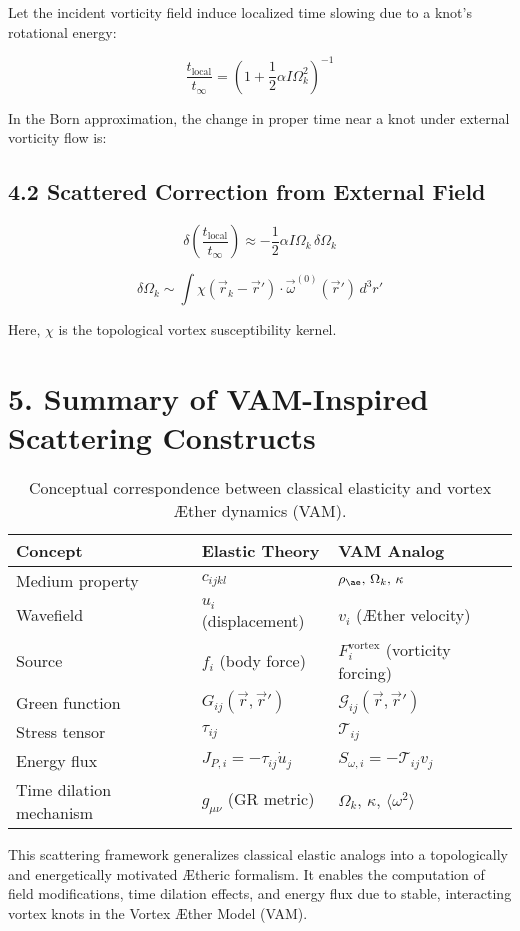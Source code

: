 Let the incident vorticity field induce localized time slowing due to a knot’s rotational energy:

\[
\frac{t_{\text{local}}}{t_{\infty}} = \left(1 + \frac{1}{2} \alpha I \Omega_k^2 \right)^{-1}
\]

In the Born approximation, the change in proper time near a knot under external vorticity flow is:

\subsection*{4.2 Scattered Correction from External Field}

\[
\delta \left( \frac{t_{\text{local}}}{t_{\infty}} \right) \approx - \frac{1}{2} \alpha I \Omega_k \, \delta \Omega_k
\]

\[
\delta \Omega_k \sim \int \chi(\vec{r}_k - \vec{r}') \cdot \vec{\omega}^{(0)}(\vec{r}') \, d^3r'
\]

Here, \(\chi\) is the topological vortex susceptibility kernel.



\section*{5. Summary of VAM-Inspired Scattering Constructs}


\begin{table}[h!]
    \centering
    \begin{tabular}{lll}
        \toprule
        \textbf{Concept} & \textbf{Elastic Theory} & \textbf{VAM Analog} \\
        \midrule
        Medium property & \( c_{ijkl} \) & \( \rho_{\ae},\, \Omega_k,\, \kappa \) \\
        Wavefield & \( u_i \) (displacement) & \( v_i \) (Æther velocity) \\
        Source & \( f_i \) (body force) & \( F_i^{\text{vortex}} \) (vorticity forcing) \\
        Green function & \( G_{ij}(\vec{r}, \vec{r}') \) & \( \mathcal{G}_{ij}(\vec{r}, \vec{r}') \) \\
        Stress tensor & \( \tau_{ij} \) & \( \mathcal{T}_{ij} \) \\
        Energy flux & \( J_{P,i} = -\tau_{ij} \dot{u}_j \) & \( S_{\omega,i} = -\mathcal{T}_{ij} v_j \) \\
        Time dilation mechanism & \( g_{\mu\nu} \) (GR metric) & \( \Omega_k,\, \kappa,\, \langle \omega^2 \rangle \) \\
        \bottomrule
    \end{tabular}
    \caption{Conceptual correspondence between classical elasticity and vortex Æther dynamics (VAM).}
    \label{tab:elastic-vam-analogy}
\end{table}



This scattering framework generalizes classical elastic analogs into a topologically and energetically motivated Ætheric formalism. It enables the computation of field modifications, time dilation effects, and energy flux due to stable, interacting vortex knots in the Vortex Æther Model (VAM).